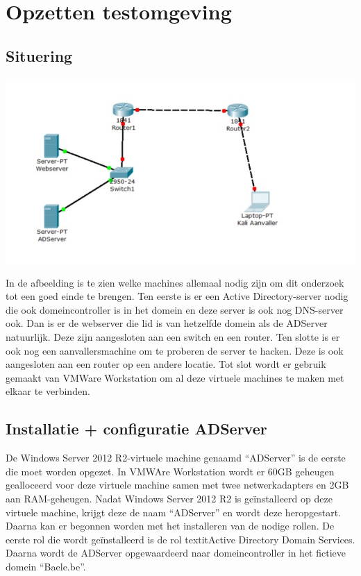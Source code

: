 \documentclass[pdftex,a4paper,12pt]{report}
\begin{document}
\section{Opzetten testomgeving}
\subsection{Situering}
\begin{center}
\includegraphics{img/Situatie}
\end{center}

In de afbeelding is te zien welke machines allemaal nodig zijn om dit onderzoek tot een goed einde te brengen. Ten eerste is er een Active Directory-server nodig die ook domeincontroller is in het domein en deze server is ook nog DNS-server ook. Dan is er de webserver die lid is van hetzelfde domein als de ADServer natuurlijk. Deze zijn aangesloten aan een switch en een router. Ten slotte is er ook nog een aanvallersmachine om te proberen de server te hacken. Deze is ook aangesloten aan een router op een andere locatie. Tot slot wordt er gebruik gemaakt van VMWare Workstation om al deze virtuele machines te maken met elkaar te verbinden.

\subsection{Installatie + configuratie ADServer}
De Windows Server 2012 R2-virtuele machine genaamd "`ADServer"' is de eerste die moet worden opgezet. In VMWAre Workstation wordt er 60GB geheugen gealloceerd voor deze virtuele machine samen met twee netwerkadapters en 2GB aan RAM-geheugen. Nadat Windows Server 2012 R2 is geïnstalleerd op deze virtuele machine, krijgt deze de naam "`ADServer"' en wordt deze heropgestart. Daarna kan er begonnen worden met het installeren van de nodige rollen. De eerste rol die wordt geïnstalleerd is de rol textit{Active Directory Domain Services}. Daarna wordt de ADServer opgewaardeerd naar domeincontroller in het fictieve domein "`Baele.be"'. \newline 
\end{document}

